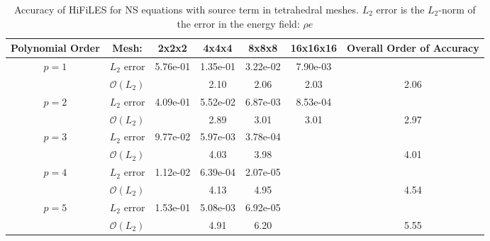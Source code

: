 \begin{table}[H]
\centering
\begin{tabular}{ c c c c c c c} 
  
 Polynomial Order & Mesh: & 2x2x2 & 4x4x4 & 8x8x8 & 16x16x16 & Overall Order of Accuracy \\ 
 \hline 
 \multirow{2}{*}{$p = 1$} & $L_2$ error & 5.76e-01 & 1.35e-01 & 3.22e-02 & 7.90e-03 &   \\ 
  
   & $\mathcal{O}(L_2)$ &   & 2.10 & 2.06 & 2.03 & 2.06 \\ 
 \hline 
 \multirow{2}{*}{$p = 2$} & $L_2$ error & 4.09e-01 & 5.52e-02 & 6.87e-03 & 8.53e-04 &   \\ 
  
   & $\mathcal{O}(L_2)$ &   & 2.89 & 3.01 & 3.01 & 2.97 \\ 
 \hline 
 \multirow{2}{*}{$p = 3$} & $L_2$ error & 9.77e-02 & 5.97e-03 & 3.78e-04 &   &   \\ 
  
   & $\mathcal{O}(L_2)$ &   & 4.03 & 3.98 &   & 4.01 \\ 
 \hline 
 \multirow{2}{*}{$p = 4$} & $L_2$ error & 1.12e-02 & 6.39e-04 & 2.07e-05 &   &   \\ 
  
   & $\mathcal{O}(L_2)$ &   & 4.13 & 4.95 &   & 4.54 \\ 
 \hline 
 \multirow{2}{*}{$p = 5$} & $L_2$ error & 1.53e-01 & 5.08e-03 & 6.92e-05 &   &   \\ 
  
   & $\mathcal{O}(L_2)$ &   & 4.91 & 6.20 &   & 5.55 \\ 
 \hline 
 \end{tabular}
\caption{Accuracy of HiFiLES for NS equations with source term in tetrahedral meshes. $L_2$ error is the $L_2$-norm of the error in the energy field: $\rho e$}
\label{table:tetsError1} 
 \end{table}
